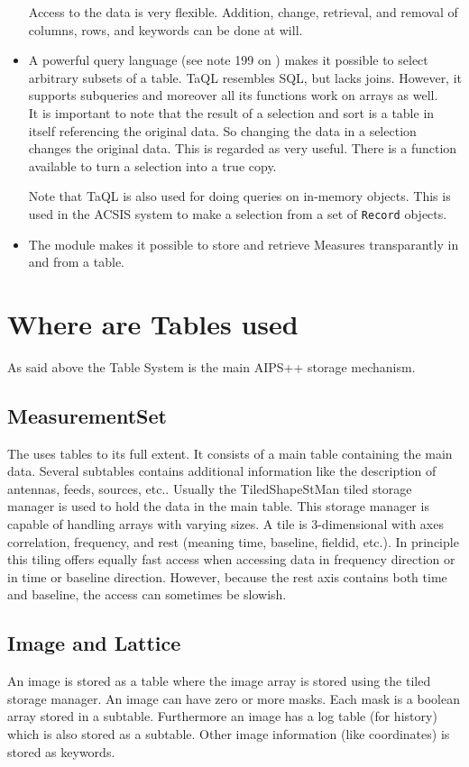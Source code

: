 \begin{itemize}
Access to the data is very flexible.
Addition, change, retrieval, and removal of columns, rows, and
keywords can be done at will. 
\item
A powerful query language (see note 199 on
) makes it possible to
select arbitrary subsets of a table. TaQL resembles SQL, but lacks joins.
However, it supports subqueries and moreover all its functions
work on arrays as well.
\\It is important to note that the result of a selection and sort is a table
in itself referencing the original data. So changing the data in a
selection changes the original data. This is regarded as very useful.
There is a function available to turn a selection into a true copy.

Note that TaQL is also used for doing queries on in-memory objects.
This is used in the ACSIS system to make a selection from a set of
\texttt{Record} objects.

\item
The 
module makes it possible to store and retrieve
Measures transparantly in and from a table.
\end{itemize}

\section{Where are Tables used}
As said above the Table System is the main AIPS++ storage mechanism.
\subsection{MeasurementSet}
The  uses tables to
its full extent. It consists of a main table containing the main data.
Several subtables contains additional information like the description
of antennas, feeds, sources, etc..
Usually the TiledShapeStMan tiled storage manager is used to hold the
data in the main table. This storage manager is capable of handling
arrays with varying sizes. A tile is 3-dimensional with axes 
correlation, frequency, and rest (meaning time, baseline, fieldid,
etc.). In principle this tiling offers equally fast access when
accessing data in frequency direction or in time or baseline
direction. However, because the rest axis contains both time and
baseline, the access can sometimes be slowish.

\subsection{Image and Lattice}
An image is stored as a table where the image array is stored using
the tiled storage manager. An image can have zero or more masks. Each
mask is a boolean array stored in a subtable. Furthermore an image has
a log table (for history) which is also stored as a subtable. Other
image information (like coordinates) is stored as keywords.

